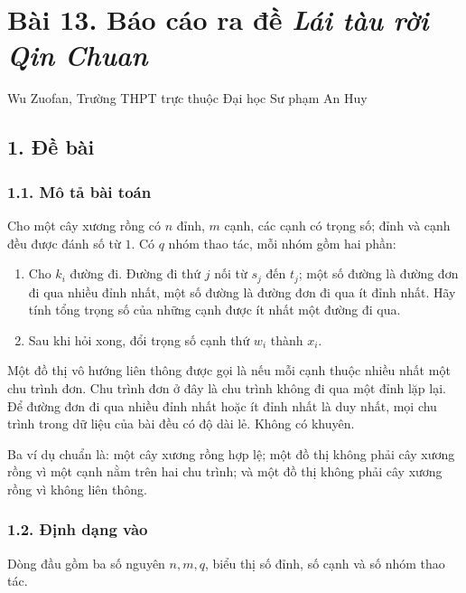 \documentclass[11pt]{article}
\begin{document}
\section*{Bài 13. Báo cáo ra đề \emph{Lái tàu rời Qin Chuan}}

\begin{center}
Wu Zuofan, Trường THPT trực thuộc Đại học Sư phạm An Huy
\end{center}

\subsection*{1. Đề bài}

\subsubsection*{1.1. Mô tả bài toán}

Cho một cây xương rồng có \(n\) đỉnh, \(m\) cạnh, các cạnh có trọng số; đỉnh và
cạnh đều được đánh số từ \(1\). Có \(q\) nhóm thao tác, mỗi nhóm gồm hai phần:

\begin{enumerate}
  \item Cho \(k_i\) đường đi. Đường đi thứ \(j\) nối từ \(s_j\) đến \(t_j\);
  một số đường là đường đơn đi qua nhiều đỉnh nhất, một số đường là đường đơn
  đi qua ít đỉnh nhất. Hãy tính tổng trọng số của những cạnh được ít nhất một
  đường đi qua.
  \item Sau khi hỏi xong, đổi trọng số cạnh thứ \(w_i\) thành \(x_i\).
\end{enumerate}

Một đồ thị vô hướng liên thông được gọi là  nếu mỗi cạnh
thuộc nhiều nhất một chu trình đơn. Chu trình đơn ở đây là chu trình không đi
qua một đỉnh lặp lại. Để đường đơn đi qua nhiều đỉnh nhất hoặc ít đỉnh nhất là
duy nhất, mọi chu trình trong dữ liệu của bài đều có độ dài lẻ. Không có khuyên.

Ba ví dụ chuẩn là: một cây xương rồng hợp lệ; một đồ thị không phải cây xương
rồng vì một cạnh nằm trên hai chu trình; và một đồ thị không phải cây xương
rồng vì không liên thông.

\subsubsection*{1.2. Định dạng vào}

Dòng đầu gồm ba số nguyên \(n,m,q\), biểu thị số đỉnh, số cạnh và số nhóm thao
tác.
\end{document}
